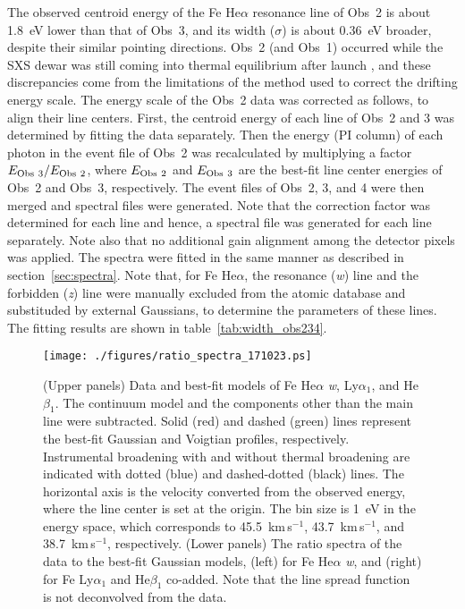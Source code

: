 The observed centroid energy of the Fe He$\alpha$ resonance line
of Obs~2 is about 1.8~eV lower than that of Obs~3, and its width
($\sigma$) is about 0.36~eV broader, despite their similar pointing
directions. Obs~2 (and Obs~1) occurred while the SXS dewar was still
coming into thermal equilibrium after launch \citep{fujimoto16}, and
these discrepancies come from the limitations of the method used to
correct the drifting energy scale. The energy scale of the Obs~2 data
was corrected as follows, to align their line centers. First, the
centroid energy of each line of Obs~2 and 3 was determined by fitting
the data separately. Then the energy (PI column) of each photon in the
event file of Obs~2 was recalculated by multiplying a factor $E_{\rm
Obs~3}/E_{\rm Obs~2}$, where $E_{\rm Obs~2}$ and $E_{\rm Obs~3}$ are the
best-fit line center energies of Obs~2 and Obs~3, respectively. The
event files of Obs~2, 3, and 4 were then merged and spectral files were
generated.  Note that the correction factor was determined for each line
and hence, a spectral file was generated for each line separately. Note
also that no additional gain alignment among the detector pixels was
applied. The spectra were fitted in the same manner as described in
section~\ref{sec:spectra}. Note that, for Fe He$\alpha$, the resonance
({\it w}) line and the forbidden ({\it z}) line were manually excluded
from the atomic database and substituded by external Gaussians, to
determine the parameters of these lines. The fitting results are shown
in table~\ref{tab:width_obs234}.

\begin{figure*}
\begin{center}
\texttt{[image: ./figures/ratio\_spectra\_171023.ps]}
\end{center}
 \caption{(Upper panels) Data and best-fit models of Fe He$\alpha$ {\it w}, Ly$\alpha_1$, and He$\beta_1$. The continuum model and the components other than the main line were subtracted. Solid (red) and dashed (green) lines represent the best-fit Gaussian and Voigtian profiles, respectively. Instrumental broadening with and without thermal broadening are indicated with dotted (blue) and dashed-dotted (black) lines. The horizontal axis is the velocity converted from the observed energy, where the line center is set at the origin. The bin size is 1~eV in the energy space, which corresponds to 45.5~km\,s$^{-1}$, 43.7~km\,s$^{-1}$, and 38.7~km\,s$^{-1}$, respectively. (Lower panels) The ratio spectra of the data to the best-fit Gaussian models, (left) for Fe He$\alpha$ {\it w}, and (right) for Fe Ly$\alpha_1$ and He$\beta_1$ co-added. Note that the line spread function is not deconvolved from the data.}
 \label{fig:stacked_ratio_spectra}
\end{figure*}

